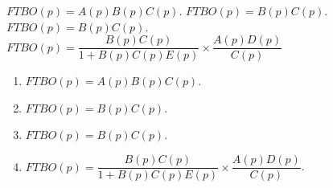 \begin{corrigebox}
$FTBO(p) = A(p) B(p) C(p)$.
$FTBO(p) = B(p) C(p)$.
$FTBO(p) = B(p) C(p)$.
$ FTBO(p) = \dfrac{B(p) C(p)}{1+B(p) C(p) E(p)} \times \dfrac{A(p) D(p)}{C(p)}$

\begin{enumerate}
\item $FTBO(p) = A(p) B(p) C(p)$.
\item $FTBO(p) = B(p) C(p)$.
\item $FTBO(p) = B(p) C(p)$.
\item $FTBO(p) = \dfrac{B(p) C(p)}{1+B(p) C(p) E(p)} \times \dfrac{A(p) D(p)}{C(p)}$.
\end{enumerate}
\end{corrigebox}
